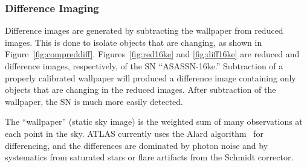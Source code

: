 \documentclass[aps,prb,twocolumn,superscriptaddress]{revtex4-1}
\begin{document}
\subsubsection{Difference Imaging}\label{sec:diffimg}

Difference images are generated by subtracting the wallpaper from reduced 
images. This is done to isolate objects that are changing, as shown in 
Figure~\ref{fig:compreddiff}.  Figures~\ref{fig:red16ke} and \ref{fig:diff16ke} 
are reduced and difference images, respectively, of the SN ``ASASSN-16ke.''  
Subtraction of a properly calibrated wallpaper will produced a difference 
image containing only objects that are changing in the reduced images.  
After subtraction of the wallpaper, the SN is much more easily detected. 

The ``wallpaper'' (static sky image) is the weighted sum of many 
observations at each point in the sky.  ATLAS currently uses the 
Alard algorithm~\cite{Alard_algorithm} for differencing, and the 
differences are dominated by photon noise and by systematics from 
saturated stars or flare artifacts from the Schmidt corrector.
\end{document}
